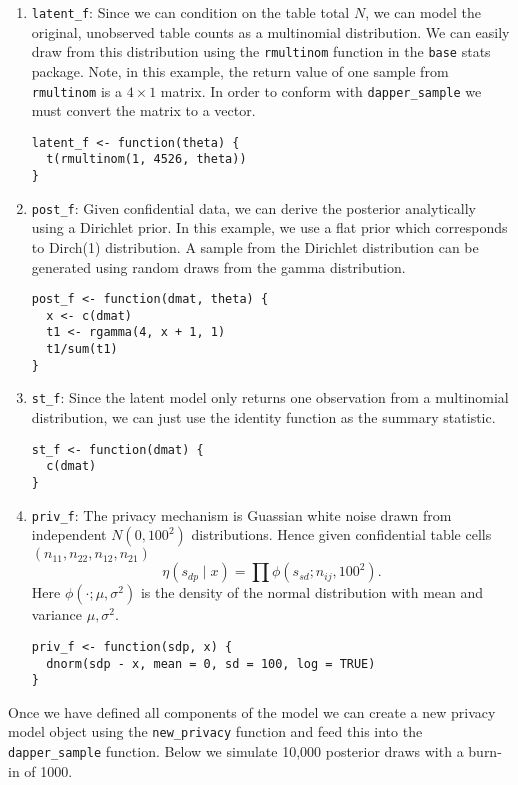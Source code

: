 \begin{enumerate}
\def\labelenumi{\arabic{enumi}.}
\item
  \texttt{latent\_f}: Since we can condition on the table total \(N\), we can model the original, unobserved table counts as a multinomial
  distribution. We can easily draw from this distribution using the
  \texttt{rmultinom} function in the \texttt{base} stats package. Note, in this example,
  the return value of one sample from \texttt{rmultinom} is a \(4 \times 1\) matrix. In order to
  conform with \texttt{dapper\_sample} we must convert the matrix to a vector.

\begin{verbatim}
latent_f <- function(theta) {
  t(rmultinom(1, 4526, theta))
}
\end{verbatim}
\item
  \texttt{post\_f}: Given confidential data, we can derive the posterior analytically
  using a Dirichlet prior. In this example, we use a flat prior which
  corresponds to Dirch(1) distribution. A sample from the Dirichlet distribution
  can be generated using random draws from the gamma distribution.

\begin{verbatim}
post_f <- function(dmat, theta) {
  x <- c(dmat)
  t1 <- rgamma(4, x + 1, 1)
  t1/sum(t1)
}
\end{verbatim}
\item
  \texttt{st\_f}: Since the latent model only returns one observation from a multinomial
  distribution, we can just use the identity function as the summary statistic.

\begin{verbatim}
st_f <- function(dmat) {
  c(dmat)
}
\end{verbatim}
\item
  \texttt{priv\_f}: The privacy mechanism is Guassian white noise drawn from independent \(N(0,100^2)\) distributions. Hence given
  confidential table cells \((n_{11}, n_{22}, n_{12}, n_{21})\)
  \[
  \eta(s_{dp} \mid x) = \prod \phi(s_{sd}; n_{ij}, 100^2).
  \]
  Here \(\phi(\cdot;\mu,\sigma^2)\) is the density of the normal distribution
  with mean and variance \(\mu,\sigma^2\).

\begin{verbatim}
priv_f <- function(sdp, x) {
  dnorm(sdp - x, mean = 0, sd = 100, log = TRUE)
}
\end{verbatim}
\end{enumerate}

Once we have defined all components of the model we can
create a new privacy model object using the \texttt{new\_privacy} function and
feed this into the \texttt{dapper\_sample} function. Below we simulate 10,000 posterior
draws with a burn-in of 1000.

